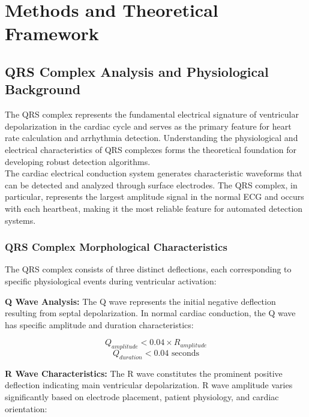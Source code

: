\documentclass[12pt,a4paper]{article}
\begin{document}
\section{Methods and Theoretical Framework}

\subsection{QRS Complex Analysis and Physiological Background}

The QRS complex represents the fundamental electrical signature of ventricular depolarization in the cardiac cycle and serves as the primary feature for heart rate calculation and arrhythmia detection. Understanding the physiological and electrical characteristics of QRS complexes forms the theoretical foundation for developing robust detection algorithms.
\\
The cardiac electrical conduction system generates characteristic waveforms that can be detected and analyzed through surface electrodes. The QRS complex, in particular, represents the largest amplitude signal in the normal ECG and occurs with each heartbeat, making it the most reliable feature for automated detection systems.

\subsubsection{QRS Complex Morphological Characteristics}

The QRS complex consists of three distinct deflections, each corresponding to specific physiological events during ventricular activation:

\textbf{Q Wave Analysis:} The Q wave represents the initial negative deflection resulting from septal depolarization. In normal cardiac conduction, the Q wave has specific amplitude and duration characteristics:

\begin{equation*}
Q_{amplitude} < 0.04 \times R_{amplitude}
\end{equation*}
\begin{equation*}
Q_{duration} < 0.04 \text{ seconds}
\end{equation*}

\newpage

\textbf{R Wave Characteristics:} The R wave constitutes the prominent positive deflection indicating main ventricular depolarization. R wave amplitude varies significantly based on electrode placement, patient physiology, and cardiac orientation:
\end{document}
